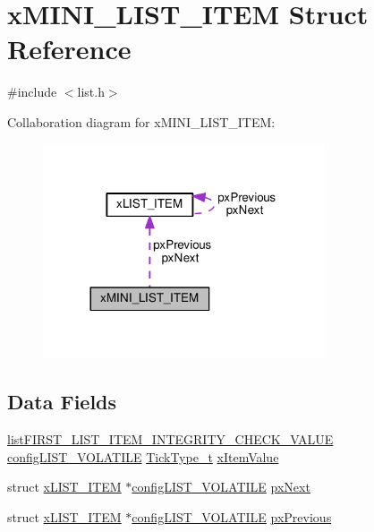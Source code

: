\hypertarget{structxMINI__LIST__ITEM}{}\section{x\+M\+I\+N\+I\+\_\+\+L\+I\+S\+T\+\_\+\+I\+T\+EM Struct Reference}
\label{structxMINI__LIST__ITEM}


{\ttfamily \#include $<$list.\+h$>$}



Collaboration diagram for x\+M\+I\+N\+I\+\_\+\+L\+I\+S\+T\+\_\+\+I\+T\+EM\+:\nopagebreak
\begin{figure}[H]
\begin{center}
\leavevmode
\includegraphics[width=236pt]{d9/db0/structxMINI__LIST__ITEM__coll__graph}
\end{center}
\end{figure}
\subsection*{Data Fields}
\begin{DoxyCompactItemize}
\item 
\hyperlink{list_8h_a3611bd5d5d87cb26ac1dc7a4852b94a0}{list\+F\+I\+R\+S\+T\+\_\+\+L\+I\+S\+T\+\_\+\+I\+T\+E\+M\+\_\+\+I\+N\+T\+E\+G\+R\+I\+T\+Y\+\_\+\+C\+H\+E\+C\+K\+\_\+\+V\+A\+L\+UE} \hyperlink{list_8h_a2d5de557c5561c8980d1bf51d87d8cba}{config\+L\+I\+S\+T\+\_\+\+V\+O\+L\+A\+T\+I\+LE} \hyperlink{portmacro_8h_aa69c48c6e902ce54f70886e6573c92a9}{Tick\+Type\+\_\+t} \hyperlink{structxMINI__LIST__ITEM_aae79c54ac1efa30959e68604cc23b29e}{x\+Item\+Value}
\item 
struct \hyperlink{structxLIST__ITEM}{x\+L\+I\+S\+T\+\_\+\+I\+T\+EM} $\ast$\hyperlink{list_8h_a2d5de557c5561c8980d1bf51d87d8cba}{config\+L\+I\+S\+T\+\_\+\+V\+O\+L\+A\+T\+I\+LE} \hyperlink{structxMINI__LIST__ITEM_aa7ae770b0f10daeb9ac76c6f7dd5608e}{px\+Next}
\item 
struct \hyperlink{structxLIST__ITEM}{x\+L\+I\+S\+T\+\_\+\+I\+T\+EM} $\ast$\hyperlink{list_8h_a2d5de557c5561c8980d1bf51d87d8cba}{config\+L\+I\+S\+T\+\_\+\+V\+O\+L\+A\+T\+I\+LE} \hyperlink{structxMINI__LIST__ITEM_a732c666bb97560eb1b094a2c411269ab}{px\+Previous}
\end{DoxyCompactItemize}


